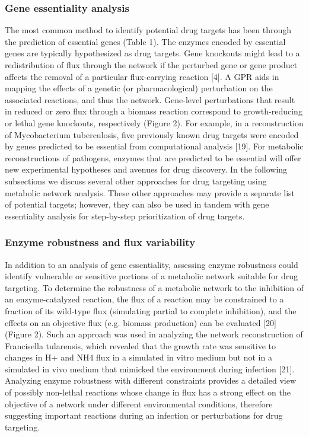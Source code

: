 \subsubsection{Gene essentiality analysis}
The most common method to identify potential drug targets has been 
through the prediction of essential genes (Table 1). The enzymes 
encoded by essential genes are typically hypothesized as drug targets. 
Gene knockouts might lead to a redistribution of flux through the 
network if the perturbed gene or gene product affects the removal 
of a particular flux-carrying reaction [4]. A GPR aids in mapping 
the effects of a genetic (or pharmacological) perturbation on the 
associated reactions, and thus the network. Gene-level perturbations 
that result in reduced or zero flux through a biomass reaction 
correspond to growth-reducing or lethal gene knockouts, 
respectively (Figure 2). For example, in a reconstruction of 
Mycobacterium tuberculosis, five previously known drug targets 
were encoded by genes predicted to be essential from computational 
analysis [19]. For metabolic reconstructions of pathogens, 
enzymes that are predicted to be essential will offer new 
experimental hypotheses and avenues for drug discovery. In the 
following subsections we discuss several other approaches for 
drug targeting using metabolic network analysis. These other 
approaches may provide a separate list of potential 
targets; however, they can also be used in tandem with 
gene essentiality analysis for step-by-step prioritization 
of drug targets.

\subsubsection{Enzyme robustness and flux variability}
In addition to an analysis of gene essentiality, assessing enzyme 
robustness could identify vulnerable or sensitive portions of a 
metabolic network suitable for drug targeting. To determine the 
robustness of a metabolic network to the inhibition of an 
enzyme-catalyzed reaction, the flux of a reaction may be constrained 
to a fraction of its wild-type flux (simulating partial to 
complete inhibition), and the effects on an objective flux 
(e.g. biomass production) can be evaluated [20] (Figure 2). 
Such an approach was used in analyzing the network reconstruction 
of Francisella tularensis, which revealed that the growth rate 
was sensitive to changes in H+ and NH4 flux in a simulated in vitro 
medium but not in a simulated in vivo medium that mimicked the 
environment during infection [21]. Analyzing enzyme robustness with 
different constraints provides a detailed view of possibly non-lethal 
reactions whose change in flux has a strong effect on the objective 
of a network under different environmental conditions, therefore 
suggesting important reactions during an infection or perturbations 
for drug targeting.

